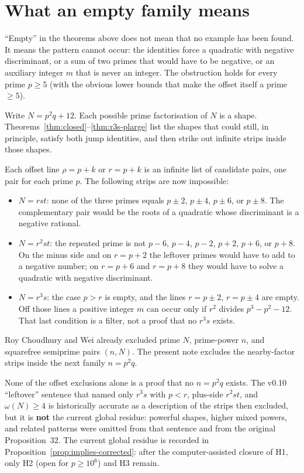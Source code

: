 \documentclass[11pt,reqno]{amsart}
\theoremstyle{definition}
\begin{document}
\section{What an empty family means}
\label{sec:empty}

``Empty'' in the theorems above does not mean that no example has been found.
It means the pattern cannot occur: the identities force a quadratic with negative discriminant,
or a sum of two primes that would have to be negative, or an auxiliary integer \(m\) that is never an integer.
The obstruction holds for every prime \(p\ge 5\) (with the obvious lower bounds that make the offset itself a prime \(\ge 5\)).

Write \(N=p^2q+12\). Each possible prime factorisation of \(N\) is a shape.
Theorems~\ref{thm:closed}--\ref{thm:r3s-plarge} list the shapes that could still, in principle, satisfy both jump identities,
and then strike out infinite strips inside those shapes.

Each offset line \(\rho=p+k\) or \(r=p+k\) is an infinite list of candidate pairs, one pair for each prime \(p\).
The following strips are now impossible:
\begin{itemize}
\item \(N=rst\): none of the three primes equals \(p\pm 2\), \(p\pm 4\), \(p\pm 6\), or \(p\pm 8\).
The complementary pair would be the roots of a quadratic whose discriminant is a negative rational.
\item \(N=r^2st\): the repeated prime is not \(p-6\), \(p-4\), \(p-2\), \(p+2\), \(p+6\), or \(p+8\).
On the minus side and on \(r=p+2\) the leftover primes would have to add to a negative number;
on \(r=p+6\) and \(r=p+8\) they would have to solve a quadratic with negative discriminant.
\item \(N=r^3s\): the case \(p>r\) is empty, and the lines \(r=p\pm 2\), \(r=p\pm 4\) are empty.
Off those lines a positive integer \(m\) can occur only if \(r^2\) divides \(p^3-p^2-12\).
That last condition is a filter, not a proof that no \(r^3s\) exists.
\end{itemize}
Roy Choudhury and Wei already excluded prime \(N\), prime-power \(n\), and squarefree semiprime pairs \((n,N)\).
The present note excludes the nearby-factor strips inside the next family \(n=p^2q\).

None of the offset exclusions alone is a proof that no \(n=p^2q\) exists.
The v0.10 ``leftover'' sentence that named only \(r^3s\) with \(p<r\), plus-side \(r^2st\), and \(\omega(N)\ge 4\) is historically accurate as a description of the strips then excluded, but it is \textbf{not} the current global residue: powerful shapes, higher mixed powers, and related patterns were omitted from that sentence and from the original Proposition~32. The current global residue is recorded in Proposition~\ref{prop:implies-corrected}: after the computer-assisted closure of H1, only H2 (open for \(p\ge 10^6\)) and H3 remain.
\end{document}
